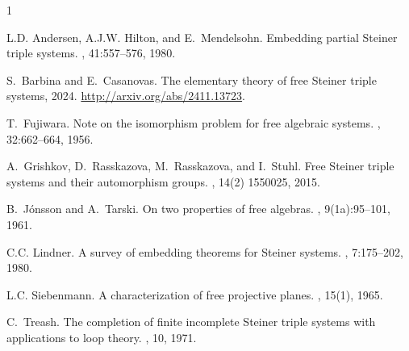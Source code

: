 \begin{thebibliography}{1}

L.D. Andersen, A.J.W. Hilton, and E.~Mendelsohn.
\newblock Embedding partial {S}teiner triple systems.
, 41:557--576,
  1980.

S.~Barbina and E.~Casanovas.
\newblock The elementary theory of free {S}teiner triple systems, 2024.
\newblock \url{http://arxiv.org/abs/2411.13723}.

T.~Fujiwara.
\newblock Note on the isomorphism problem for free algebraic systems.
, 32:662--664, 1956.

A.~Grishkov, D.~Rasskazova, M.~Rasskazova, and I.~Stuhl.
\newblock Free Steiner triple systems and their automorphism groups.
, 14(2) 1550025, 2015.

B.~J\'onsson and A.~Tarski.
\newblock On two properties of free algebras.
, 9(1a):95--101, 1961.

C.C. Lindner.
\newblock A survey of embedding theorems for {S}teiner systems.
, 7:175--202, 1980.

L.C. Siebenmann.
\newblock A characterization of free projective planes.
, 15(1), 1965.

C.~Treash.
\newblock The completion of finite incomplete {S}teiner triple systems with
  applications to loop theory.
, 10, 1971.

\end{thebibliography}
